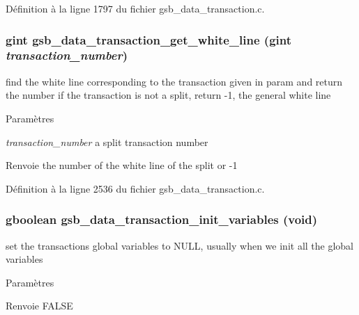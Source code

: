 Définition à la ligne 1797 du fichier gsb\_\-data\_\-transaction.c.

\subsubsection[{gsb\_\-data\_\-transaction\_\-get\_\-white\_\-line}]{\setlength{\rightskip}{0pt plus 5cm}gint gsb\_\-data\_\-transaction\_\-get\_\-white\_\-line (gint {\em transaction\_\-number})}\label{gsb__data__transaction_8c_aaa9fc2828adf9b46a72b51e31df44d58}
find the white line corresponding to the transaction given in param and return the number if the transaction is not a split, return -\/1, the general white line


\begin{DoxyParams}{Paramètres}
\item[{\em transaction\_\-number}]a split transaction number\end{DoxyParams}
\begin{DoxyReturn}{Renvoie}
the number of the white line of the split or -\/1 
\end{DoxyReturn}


Définition à la ligne 2536 du fichier gsb\_\-data\_\-transaction.c.

\subsubsection[{gsb\_\-data\_\-transaction\_\-init\_\-variables}]{\setlength{\rightskip}{0pt plus 5cm}gboolean gsb\_\-data\_\-transaction\_\-init\_\-variables (void)}\label{gsb__data__transaction_8c_a63f15bb161bcca8969c77167a8ae0b97}
set the transactions global variables to NULL, usually when we init all the global variables


\begin{DoxyParams}{Paramètres}
\item[{\em }]\end{DoxyParams}
\begin{DoxyReturn}{Renvoie}
FALSE 
\end{DoxyReturn}


